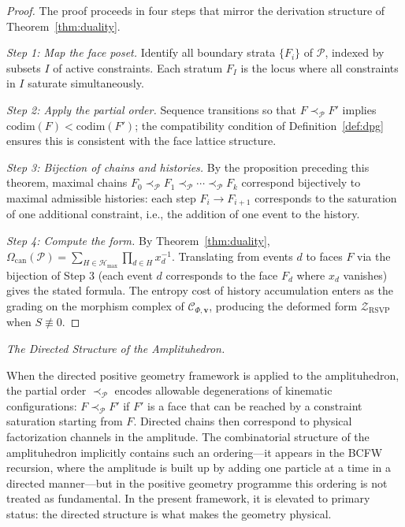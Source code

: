 \documentclass[11pt]{article}
\theoremstyle{plain}
\theoremstyle{definition}
\theoremstyle{remark}
\newcommand{\Sf}{S}
\newcommand{\CF}{\Omega_{\mathrm{can}}}
\newcommand{\Ccat}{\mathcal{C}_{\Phi,\mathbf{v}}}
\newcommand{\ZRSVP}{\mathcal{Z}_{\mathrm{RSVP}}}
\newcommand{\Hmax}{\mathcal{H}_{\max}}
\begin{document}
\begin{proof}
The proof proceeds in four steps that mirror the derivation structure of Theorem~\ref{thm:duality}.

\emph{Step 1: Map the face poset.} Identify all boundary strata $\{F_i\}$ of $\mathcal{P}$, indexed by subsets $I$ of active constraints. Each stratum $F_I$ is the locus where all constraints in $I$ saturate simultaneously.

\emph{Step 2: Apply the partial order.} Sequence transitions so that $F \prec_{\mathcal{P}} F'$ implies $\mathrm{codim}(F) < \mathrm{codim}(F')$; the compatibility condition of Definition~\ref{def:dpg} ensures this is consistent with the face lattice structure.

\emph{Step 3: Bijection of chains and histories.} By the proposition preceding this theorem, maximal chains $F_0 \prec_{\mathcal{P}} F_1 \prec_{\mathcal{P}} \cdots \prec_{\mathcal{P}} F_k$ correspond bijectively to maximal admissible histories: each step $F_i \to F_{i+1}$ corresponds to the saturation of one additional constraint, i.e., the addition of one event to the history.

\emph{Step 4: Compute the form.} By Theorem~\ref{thm:duality}, $\CF(\mathcal{P}) = \sum_{H \in \Hmax} \prod_{d \in H} x_d^{-1}$. Translating from events $d$ to faces $F$ via the bijection of Step 3 (each event $d$ corresponds to the face $F_d$ where $x_d$ vanishes) gives the stated formula. The entropy cost of history accumulation enters as the grading on the morphism complex of $\Ccat$, producing the deformed form $\ZRSVP$ when $\Sf \not\equiv 0$.
\end{proof}

\medskip\noindent\textit{The Directed Structure of the Amplituhedron.}

When the directed positive geometry framework is applied to the amplituhedron, the partial order $\prec_{\mathcal{P}}$ encodes allowable degenerations of kinematic configurations: $F \prec_{\mathcal{P}} F'$ if $F'$ is a face that can be reached by a constraint saturation starting from $F$. Directed chains then correspond to physical factorization channels in the amplitude. The combinatorial structure of the amplituhedron implicitly contains such an ordering---it appears in the BCFW recursion, where the amplitude is built up by adding one particle at a time in a directed manner---but in the positive geometry programme this ordering is not treated as fundamental. In the present framework, it is elevated to primary status: the directed structure is what makes the geometry physical.
\end{document}
